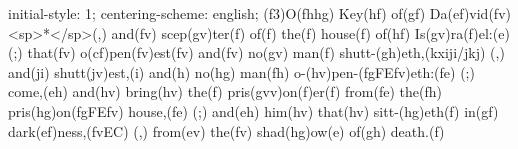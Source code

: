 initial-style: 1;
centering-scheme: english;
(f3)O(fhhg) Key(hf) of(gf) Da(ef)vid(fv) <sp>*</sp>(,) and(fv) scep(gv)ter(f) of(f) the(f) house(f) of(hf) Is(gv)ra(f)el:(e) (;) that(fv) o(cf)pen(fv)est(fv) and(fv) no(gv) man(f) shutt-(gh)eth,(kxiji/jkj) (,) and(ji) shutt(jv)est,(i) and(h) no(hg) man(fh) o-(hv)pen-(fgFEfv)eth:(fe) (;) come,(eh) and(hv) bring(hv) the(f) pris(gvv)on(f)er(f) from(fe) the(fh) pris(hg)on(fgFEfv) house,(fe) (;) and(eh) him(hv) that(hv) sitt-(hg)eth(f) in(gf) dark(ef)ness,(fvEC) (,) from(ev) the(fv) shad(hg)ow(e) of(gh) death.(f)
